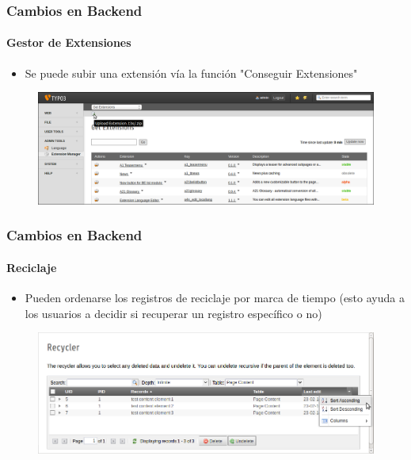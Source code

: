 
\begin{frame}[fragile]
	\frametitle{Cambios en Backend}
	\framesubtitle{Gestor de Extensiones}

 	\begin{itemize}
		\item Se puede subir una extensión vía la función "Conseguir Extensiones"
	\end{itemize}

	\begin{figure}
		\includegraphics[width=0.95\linewidth]{Images/BackendChanges/UploadExtension.png}
	\end{figure}

\end{frame}


\begin{frame}[fragile]
	\frametitle{Cambios en Backend}
	\framesubtitle{Reciclaje}

 	\begin{itemize}
		\item Pueden ordenarse los registros de reciclaje por marca de tiempo\newline
			\small(esto ayuda a los usuarios a decidir si recuperar un registro específico o no)\normalsize
	\end{itemize}

	\begin{figure}
		\includegraphics[width=0.95\linewidth]{Images/BackendChanges/RecyclerSortRecord.png}
	\end{figure}

\end{frame}

